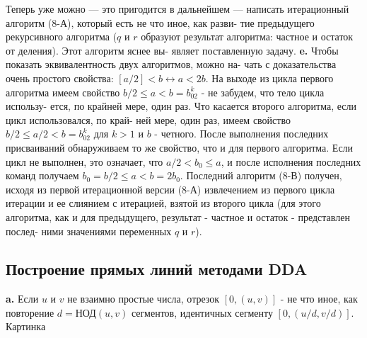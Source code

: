 \documentclass{mai_book}
\begin{document}
\hspace{15pt}Теперь уже можно — это пригодится в дальнейшем — написать\newline
итерационный алгоритм (8-А), который есть не что иное, как разви-\newline
тие предыдущего рекурсивного алгоритма ($q$ и $r$ образуют результат
алгоритма: частное и остаток от деления). Этот алгоритм яснее вы-
являет поставленную задачу.\newline
\hspace*{15pt}\textbf{e.} Чтобы показать эквивалентность двух алгоритмов, можно на-
чать с доказательства очень простого свойства: $[a/2]<b\leftrightarrow a<2b$.\newline
\hspace*{15pt}На выходе из цикла первого алгоритма имеем свойство
$b/2\leq a<b=b_02^k$ - не забудем, что тело цикла использу-
ется, по крайней мере, один раз.\newline
\hspace*{15pt}Что касается второго алгоритма, если цикл использовался, по край-
ней мере, один раз, имеем свойство $b/2\leq a/2<b=b_02^k$ для $k>1$ и $b$ - четного. После выполнения последних присваиваний обнаруживаем
то же свойство, что и для первого алгоритма. Если цикл не выполнен,
это означает, что $a/2<b_0\leq a$, и после исполнения последних команд
получаем $b_0=b/2\leq a<b=2b_0$.\newline
\hspace*{15pt}Последний алгоритм (8-В) получен, исходя из первой итерационной
версии (8-А) извлечением из первого цикла итерации и ее слиянием с
итерацией, взятой из второго цикла (для этого алгоритма, как и для
предыдущего, результат - частное и остаток - представлен послед-
ними значениями переменных $q$ и $r$).\newline
\subsection{Построение прямых линий методами DDA}
\hspace*{15pt}\textbf{a.} Если $u$ и $v$ не взаимно простые числа, отрезок $[0, (u,v)]$ - не что
иное, как повторение $d=$НОД$(u,v)$ сегментов, идентичных сегменту
$[0,(u/d,v/d)]$.\newline
Картинка
\newpage
\end{document}
